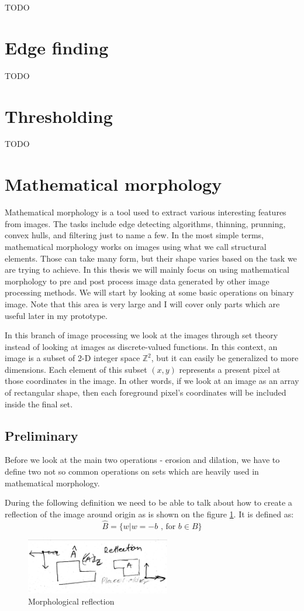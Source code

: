 \documentclass[
  digital,     %
  oneside,     %
  nosansbold,  %
  nocolorbold, %
  lof,         %
  lot,         %
]{fithesis4}
\newcommand*{\Z}{\ensuremath{\mathbb{Z}}}
\begin{document}
TODO

\section{Edge finding}
TODO

\section{Thresholding}
TODO

\section{Mathematical morphology}

Mathematical morphology is a tool used to extract various interesting features
from images. The tasks include edge detecting algorithms, thinning, prunning,
convex hulls, and filtering just to name a few. In the most simple terms,
mathematical morphology works on images using what we call structural elements.
Those can take many form, but their shape varies based on the task we are trying
to achieve. In this thesis we will mainly focus on using mathematical morphology
to pre and post process image data generated by other image processing methods.
We will start by looking at some basic operations on binary image. Note that
this area is very large and I will cover only parts which are useful later in my
prototype.

In this branch of image processing we look at the images through set theory
instead of looking at images as discrete-valued functions. In this context, an
image is a subset of 2-D integer space $\Z^2$, but it can easily be generalized
to more dimensions. Each element of this subset $(x, y)$ represents a present
pixel at those coordinates in the image. In other words, if we look at an image
as an array of rectangular shape, then each foreground pixel's coordinates will
be included inside the final set.

\subsection{Preliminary}
Before we look at the main two operations - erosion and dilation, we have to
define two not so common operations on sets which are heavily used in
mathematical morphology.

During the following definition we need to be able to talk about how to create a
reflection of the image around origin as is shown on the figure
\ref{fig:morp_refl}. It is defined as: 
$$\hat{B} = \{w | w=-b \text{ , for } b \in B\}$$
\begin{figure}
    \begin{center}
        \includegraphics[width=6.3cm]{resources/morph_reflection.jpg}
    \end{center}
    \caption{Morphological reflection} %
    \label{fig:morp_refl}
\end{figure}
\end{document}
